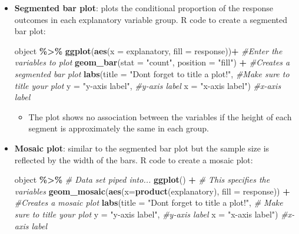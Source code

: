 \documentclass[
]{report}
\newenvironment{Shaded}{\begin{snugshade}}{\end{snugshade}}
\newcommand{\AttributeTok}[1]{\textcolor[rgb]{0.13,0.29,0.53}{#1}}
\newcommand{\CommentTok}[1]{\textcolor[rgb]{0.56,0.35,0.01}{\textit{#1}}}
\newcommand{\FunctionTok}[1]{\textcolor[rgb]{0.13,0.29,0.53}{\textbf{#1}}}
\newcommand{\NormalTok}[1]{#1}
\newcommand{\SpecialCharTok}[1]{\textcolor[rgb]{0.81,0.36,0.00}{\textbf{#1}}}
\newcommand{\StringTok}[1]{\textcolor[rgb]{0.31,0.60,0.02}{#1}}
\providecommand{\tightlist}{%
  \setlength{\itemsep}{0pt}\setlength{\parskip}{0pt}}
\begin{document}
\begin{itemize}
\item
  \textbf{Segmented bar plot}: plots the conditional proportion of the response outcomes in each explanatory variable group. R code to create a segmented bar plot:

\begin{Shaded}
\begin{Highlighting}[]
\NormalTok{object }\SpecialCharTok{\%\textgreater{}\%}
    \FunctionTok{ggplot}\NormalTok{(}\FunctionTok{aes}\NormalTok{(}\AttributeTok{x =}\NormalTok{ explanatory, }\AttributeTok{fill =}\NormalTok{ response))}\SpecialCharTok{+} \CommentTok{\#Enter the variables to plot}
    \FunctionTok{geom\_bar}\NormalTok{(}\AttributeTok{stat =} \StringTok{"count"}\NormalTok{, }\AttributeTok{position =} \StringTok{"fill"}\NormalTok{) }\SpecialCharTok{+} \CommentTok{\#Creates a segmented bar plot}
    \FunctionTok{labs}\NormalTok{(}\AttributeTok{title =} \StringTok{"Don\textquotesingle{}t forget to title a plot!"}\NormalTok{, }\CommentTok{\#Make sure to title your plot}
         \AttributeTok{y =} \StringTok{"y{-}axis label"}\NormalTok{, }\CommentTok{\#y{-}axis label}
         \AttributeTok{x =} \StringTok{"x{-}axis label"}\NormalTok{)  }\CommentTok{\#x{-}axis label}
\end{Highlighting}
\end{Shaded}

  \begin{itemize}
  \tightlist
  \item
    The plot shows no association between the variables if the height of each segment is approximately the same in each group.
  \end{itemize}
\item
  \textbf{Mosaic plot}: similar to the segmented bar plot but the sample size is reflected by the width of the bars. R code to create a mosaic plot:

\begin{Shaded}
\begin{Highlighting}[]
\NormalTok{object }\SpecialCharTok{\%\textgreater{}\%} \CommentTok{\# Data set piped into...}
    \FunctionTok{ggplot}\NormalTok{() }\SpecialCharTok{+}   \CommentTok{\# This specifies the variables}
    \FunctionTok{geom\_mosaic}\NormalTok{(}\FunctionTok{aes}\NormalTok{(}\AttributeTok{x=}\FunctionTok{product}\NormalTok{(explanatory), }\AttributeTok{fill =}\NormalTok{ response)) }\SpecialCharTok{+}  \CommentTok{\#Creates a mosaic plot}
    \FunctionTok{labs}\NormalTok{(}\AttributeTok{title =} \StringTok{"Don\textquotesingle{}t forget to title a plot!"}\NormalTok{,  }\CommentTok{\# Make sure to title your plot}
         \AttributeTok{y =} \StringTok{"y{-}axis label"}\NormalTok{, }\CommentTok{\#y{-}axis label}
         \AttributeTok{x =} \StringTok{"x{-}axis label"}\NormalTok{)  }\CommentTok{\#x{-}axis label}
\end{Highlighting}
\end{Shaded}
\end{itemize}
\end{document}
